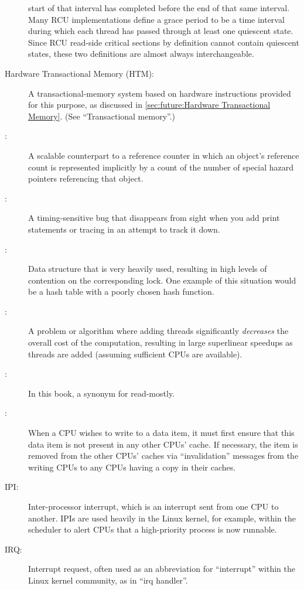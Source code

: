 \begin{description}
	start of that interval has
	completed before the end of that same interval.
	Many RCU implementations define a grace period to be a
	time interval during which each thread has passed through at
	least one quiescent state.
	Since RCU read-side critical sections by definition cannot
	contain quiescent states, these two definitions are almost
	always interchangeable.
\item[Hardware Transactional Memory (HTM):]
	A transactional-memory system based on hardware instructions
	provided for this purpose, as discussed in
	\cref{sec:future:Hardware Transactional Memory}.
	(See ``Transactional memory''.)
\item[\IXG{Hazard Pointer}:]
	A scalable counterpart to a reference counter in which an
	object's reference count is represented implicitly by a count
	of the number of special hazard pointers referencing that object.
\item[\IXG{Heisenbug}:]
	A timing-sensitive bug that disappears from sight when you
	add print statements or tracing in an attempt to track it
	down.
\item[\IXG{Hot Spot}:]
	Data structure that is very heavily used, resulting in high
	levels of contention on the corresponding lock.
	One example of this situation would be a hash table with
	a poorly chosen hash function.
\item[\IXG{Humiliatingly Parallel}:]
	A problem or algorithm where adding threads significantly
	\emph{decreases} the overall cost of the computation, resulting in
	large superlinear speedups as threads are added (assuming sufficient
	CPUs are available).
\item[\IXG{Immutable}:]
	In this book, a synonym for read-mostly.
\item[\IXG{Invalidation}:]
	When a CPU wishes to write to a data item, it must first ensure
	that this data item is not present in any other CPUs' cache.
	If necessary, the item is removed from the other CPUs' caches
	via ``invalidation'' messages from the writing CPUs to any
	CPUs having a copy in their caches.
\item[IPI:]
	Inter-processor interrupt, which is an
	interrupt sent from one CPU to another.
	IPIs are used heavily in the Linux kernel, for example, within
	the scheduler to alert CPUs that a high-priority process is now
	runnable.
\item[IRQ:]
	Interrupt request, often used as an abbreviation for ``interrupt''
	within the Linux kernel community, as in ``irq handler''.

\end{description}
